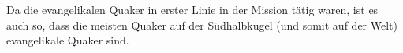 Da die evangelikalen Quaker in erster Linie in der Mission tätig waren, ist es
auch so, dass die meisten Quaker auf der Südhalbkugel (und somit auf der Welt)
evangelikale Quaker sind.

% 
% 
% 

